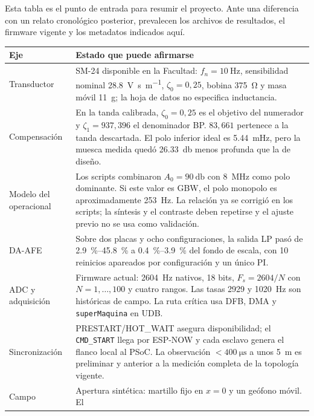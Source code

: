 Esta tabla es el punto de entrada para resumir el proyecto. Ante una diferencia
con un relato cronol\'ogico posterior, prevalecen los archivos de resultados, el
firmware vigente y los metadatos indicados aqu\'i.

\begin{center}\footnotesize
\begin{tabularx}{\textwidth}{@{}l X@{}}
\toprule
\textbf{Eje} & \textbf{Estado que puede afirmarse} \\
\midrule
Transductor & SM-24 disponible en la Facultad: $f_n=\SI{10}{\hertz}$,
sensibilidad nominal \SI{28.8}{\volt\second\per\meter}, $\zeta_0=0{,}25$,
bobina \SI{375}{\ohm} y masa m\'ovil \SI{11}{\gram}; la hoja de datos no
especifica inductancia. \\
\addlinespace[2pt]
Compensaci\'on & En la tanda calibrada, $\zeta_0=0{,}25$ es el objetivo del
numerador y $\zeta_1=937{,}396$ el denominador BP. $83{,}661$ pertenece a la
tanda descartada. El polo inferior ideal es \SI{5.44}{\milli\hertz}, pero la
muesca medida qued\'o \SI{26.33}{\decibel} menos profunda que la de dise\~no. \\
\addlinespace[2pt]
Modelo del operacional & Los scripts combinaron $A_0=\SI{90}{\decibel}$ con
\SI{8}{\mega\hertz} como polo dominante. Si este valor es GBW, el polo monopolo
es aproximadamente \SI{253}{\hertz}. La relaci\'on ya se corrigi\'o en los scripts;
la s\'intesis y el contraste deben repetirse y el ajuste previo no se usa como validaci\'on. \\
\addlinespace[2pt]
DA-AFE & Sobre dos placas y ocho configuraciones, la salida LP pas\'o de
\SIrange{2.9}{45.8}{\percent} a \SIrange{0.4}{3.9}{\percent} del fondo de
escala, con 10 reinicios apareados por configuraci\'on y un \'unico PI. \\
\addlinespace[2pt]
ADC y adquisici\'on & Firmware actual: \SI{2604}{\hertz} nativos, 18 bits,
$F_s=2604/N$ con $N=1,\ldots,100$ y cuatro rangos. Las tasas 2929 y
\SI{1020}{\hertz} son hist\'oricas de campo. La ruta cr\'itica usa DFB, DMA y
\texttt{superMaquina} en UDB. \\
\addlinespace[2pt]
Sincronizaci\'on & PRESTART/HOT\_WAIT asegura disponibilidad; el
\texttt{CMD\_START} llega por ESP-NOW y cada esclavo genera el flanco local al
PSoC. La observaci\'on $<\SI{400}{\micro\second}$ a unos \SI{5}{\meter} es
preliminar y anterior a la medici\'on completa de la topolog\'ia vigente. \\
\addlinespace[2pt]
Campo & Apertura sint\'etica: martillo fijo en $x=0$ y un ge\'ofono m\'ovil. El

\end{tabularx}
\end{center}
